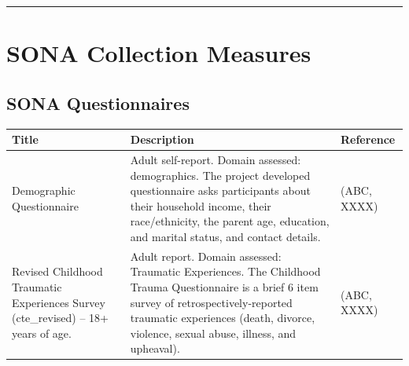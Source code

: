 \documentclass[]{book}
\begin{document}
\begin{center}\rule{0.5\linewidth}{0.5pt}\end{center}

\hypertarget{sona-collection-measures}{%
\section{SONA Collection Measures}\label{sona-collection-measures}}

\hypertarget{sona-questionnaires}{%
\subsection{SONA Questionnaires}\label{sona-questionnaires}}

\begin{longtable}[]{@{}lll@{}}
\toprule
\begin{minipage}[b]{0.32\columnwidth}\raggedright
Title\strut
\end{minipage} & \begin{minipage}[b]{0.32\columnwidth}\raggedright
Description\strut
\end{minipage} & \begin{minipage}[b]{0.27\columnwidth}\raggedright
Reference\strut
\end{minipage}\tabularnewline
\midrule
\endhead
\begin{minipage}[t]{0.32\columnwidth}\raggedright
Demographic Questionnaire\strut
\end{minipage} & \begin{minipage}[t]{0.32\columnwidth}\raggedright
Adult self-report. Domain assessed: demographics. The project developed questionnaire asks participants about their household income, their race/ethnicity, the parent age, education, and marital status, and contact details.\strut
\end{minipage} & \begin{minipage}[t]{0.27\columnwidth}\raggedright
(ABC, XXXX)\strut
\end{minipage}\tabularnewline
\begin{minipage}[t]{0.32\columnwidth}\raggedright
Revised Childhood Traumatic Experiences Survey (cte\_revised) -- 18+ years of age.\strut
\end{minipage} & \begin{minipage}[t]{0.32\columnwidth}\raggedright
Adult report. Domain assessed: Traumatic Experiences. The Childhood Trauma Questionnaire is a brief 6 item survey of retrospectively-reported traumatic experiences (death, divorce, violence, sexual abuse, illness, and upheaval).\strut
\end{minipage} & \begin{minipage}[t]{0.27\columnwidth}\raggedright
(ABC, XXXX)\strut
\end{minipage}\tabularnewline
\bottomrule
\end{longtable}
\end{document}
